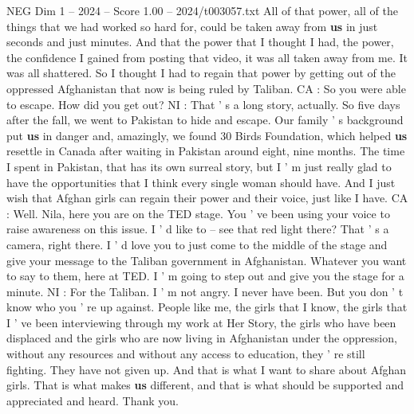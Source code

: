 \begin{textsample}{NEG Dim 1 – 2024 – Score 1.00 – 2024/t003057.txt}
All of that power, all of the things that we had worked so hard for, could be taken away from \textbf{us} in just seconds and just minutes.
And that the power that I thought I had, the power, the confidence I gained from posting that video, it was all taken away from me.
It was all shattered.
So I thought I had to regain that power by getting out of the oppressed Afghanistan that now is being ruled by Taliban.
CA : So you were able to escape.
How did you get out?
NI : That ' s a long story, actually.
So five days after the fall, we went to Pakistan to hide and escape.
Our family ' s background put \textbf{us} in danger and, amazingly, we found 30 Birds Foundation, which helped \textbf{us} resettle in Canada after waiting in Pakistan around eight, nine months.
The time I spent in Pakistan, that has its own surreal story, but I ' m just really glad to have the opportunities that I think every single woman should have.
And I just wish that Afghan girls can regain their power and their voice, just like I have.
CA : Well.
Nila, here you are on the TED stage.
You ' ve been using your voice to raise awareness on this issue.
I ' d like to -- see that red light there?
That ' s a camera, right there.
I ' d love you to just come to the middle of the stage and give your message to the Taliban government in Afghanistan.
Whatever you want to say to them, here at TED.
I ' m going to step out and give you the stage for a minute.
NI : For the Taliban.
I ' m not angry.
I never have been.
But you don ' t know who you ' re up against.
People like me, the girls that I know, the girls that I ' ve been interviewing through my work at Her Story, the girls who have been displaced and the girls who are now living in Afghanistan under the oppression, without any resources and without any access to education, they ' re still fighting.
They have not given up.
And that is what I want to share about Afghan girls.
That is what makes \textbf{us} different, and that is what should be supported and appreciated and heard.
Thank you.

\end{textsample}
